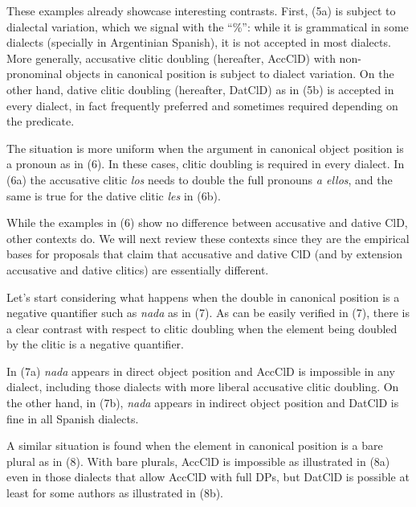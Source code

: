 \documentclass[output=paper,colorlinks,citecolor=brown,
]{langscibook}
\begin{document}


These examples already showcase interesting contrasts. First, (5a) is subject to dialectal variation, which we signal with the “\%”: while it is grammatical in some dialects (specially in Argentinian Spanish), it is not accepted in most dialects. More generally, accusative clitic doubling (hereafter, AccClD) with non-pronominal objects in canonical position is subject to dialect variation. On the other hand, dative clitic doubling (hereafter, DatClD) as in (5b) is accepted in every dialect, in fact frequently preferred and sometimes required depending on the predicate. 

The situation is more uniform when the argument in canonical object position is a pronoun as in (6). In these cases, clitic doubling is required in every dialect. In (6a) the accusative clitic \textit{los} needs to double the full pronouns \textit{a ellos}, and the same is true for the dative clitic \textit{les} in (6b).




While the examples in (6) show no difference between accusative and dative ClD, other contexts do. We will next review these contexts since they are the empirical bases for proposals that claim that accusative and dative ClD (and by extension accusative and dative clitics) are essentially different. 

Let’s start considering what happens when the double in canonical position is a negative quantifier such as \textit{nada} as in (7). As can be easily verified in (7), there is a clear contrast with respect to clitic doubling when the element being doubled by the clitic is a negative quantifier.




In (7a) \textit{nada} appears in direct object position and AccClD is impossible in any dialect, including those dialects with more liberal accusative clitic doubling. On the other hand, in (7b), \textit{nada} appears in indirect object position and DatClD is fine in all Spanish dialects.

A similar situation is found when the element in canonical position is a bare plural as in (8). With bare plurals, AccClD is impossible as illustrated in (8a) even in those dialects that allow AccClD with full DPs, but DatClD is possible at least for some authors as illustrated in (8b).


\end{document}
